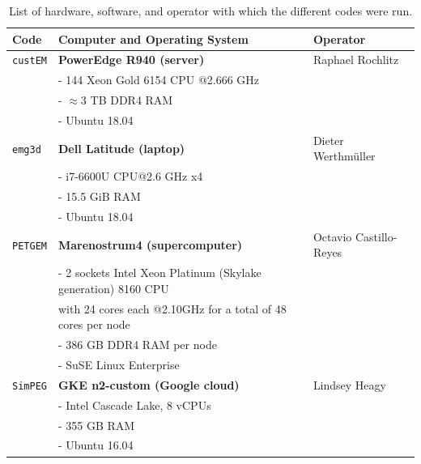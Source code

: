 \documentclass[onecolumn,extra,camera]{gji}
\newcommand{\emg}[2]{\texttt{emg#1#2}\xspace}
\newcommand{\simpeg}{\texttt{SimPEG}\xspace}
\newcommand{\custem}{\texttt{custEM}\xspace}
\newcommand{\petgem}{\texttt{PETGEM}\xspace}
\begin{document}
%
\begin{table}
\begin{minipage}{14cm}
  \centering
  \caption{List of hardware, software, and operator with which the different codes were run.}
\label{tbl:machines}
  \begin{tabularx}{\linewidth}{lXl}
  \toprule
  Code & Computer and Operating System & Operator \\
  \midrule
  \custem & \textbf{PowerEdge R940 (server)}                  & Raphael Rochlitz \\
          & - 144 Xeon Gold 6154 CPU @2.666 GHz               & \\
          & - $\approx3$ TB DDR4 RAM                          & \\
          & - Ubuntu 18.04                                    & \\[.5em]
  \emg3d  & \textbf{Dell Latitude (laptop)}                   & Dieter Werthmüller \\
          & - i7-6600U CPU@2.6 GHz x4                         & \\
          & - 15.5 GiB RAM                                    & \\
          & - Ubuntu 18.04                                    & \\[.5em]
  \petgem & \textbf{Marenostrum4 (supercomputer)}             & Octavio Castillo-Reyes \\
          & - 2 sockets Intel Xeon Platinum (Skylake generation) 8160 CPU & \\
          & \phantom{-} with 24 cores each @2.10GHz for a total of 48 cores per node & \\
          & - 386 GB DDR4 RAM per node                        & \\
          & - SuSE Linux Enterprise                           & \\[.5em]
  \simpeg & \textbf{GKE n2-custom (Google cloud)}             & Lindsey Heagy \\
          & - Intel Cascade Lake, 8 vCPUs                     & \\
          & - 355 GB RAM                                      & \\
          & - Ubuntu 16.04                                    & \\
%
  \bottomrule
\end{tabularx}
\end{minipage}
\end{table}
%
\end{document}

